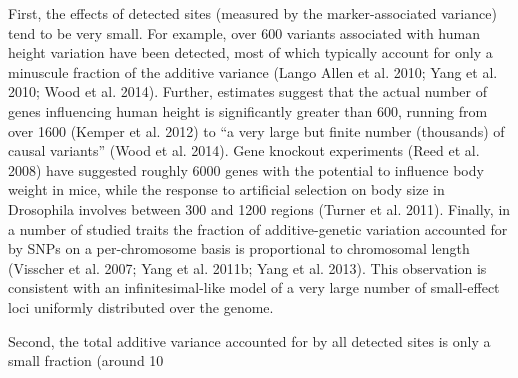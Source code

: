 \documentclass{article}
\begin{document}
First, the effects of detected sites (measured by the marker-associated variance) tend to be very small. For example, over 600 variants associated with human height variation have been detected, most of which typically account for only a minuscule fraction of the additive variance (Lango Allen et al. 2010; Yang et al. 2010; Wood et al. 2014). Further, estimates suggest that the actual number of genes influencing human height is significantly greater than 600, running from over 1600 (Kemper et al. 2012) to “a very large but finite number (thousands) of causal variants” (Wood et al. 2014). Gene knockout experiments (Reed et al. 2008) have suggested roughly 6000 genes with the potential to influence body weight in mice, while the response to artificial selection on body size in Drosophila involves between 300 and 1200 regions (Turner et al. 2011). Finally, in a number of studied traits the fraction of additive-genetic variation accounted for by SNPs on a per-chromosome basis is proportional to chromosomal length (Visscher et al. 2007; Yang et al. 2011b; Yang et al. 2013). This observation is consistent with an infinitesimal-like model of a very large number of small-effect loci uniformly distributed over the genome.

Second, the total additive variance accounted for by all detected sites is only a small fraction (around 10%
\end{document}
